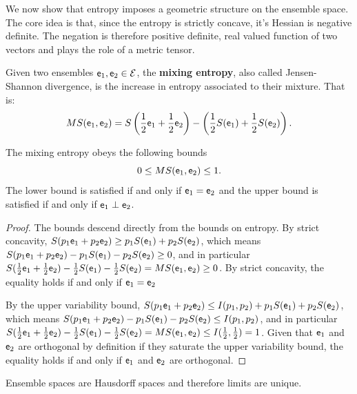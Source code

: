 We now show that entropy imposes a geometric structure on the ensemble space. The core idea is that, since the entropy is strictly concave, it's Hessian is negative definite. The negation is therefore positive definite, real valued function of two vectors and plays the role of a metric tensor.

\begin{defn}
	Given two ensembles $\mathsf{e}_1, \mathsf{e}_2 \in \mathcal{E}$, the \textbf{mixing entropy}, also called Jensen-Shannon divergence, is the increase in entropy associated to their mixture. That is:
	$$MS(\mathsf{e}_1, \mathsf{e}_2) = S\left(\frac{1}{2}\mathsf{e}_1 + \frac{1}{2} \mathsf{e}_2\right) - \left(\frac{1}{2} S(\mathsf{e}_1) + \frac{1}{2} S(\mathsf{e}_2)\right).$$
\end{defn}

\begin{coro}
	The mixing entropy obeys the following bounds
	$$ 0 \leq MS(\mathsf{e}_1, \mathsf{e}_2) \leq 1.$$
	The lower bound is satisfied if and only if $\mathsf{e}_1 = \mathsf{e}_2$ and the upper bound is satisfied if and only if $\mathsf{e}_1 \perp \mathsf{e}_2$.
\end{coro}

\begin{proof}
	The bounds descend directly from the bounds on entropy. By strict concavity, $S(p_1\mathsf{e}_1 + p_2 \mathsf{e}_2) \geq p_1 S(\mathsf{e}_1) + p_2 S(\mathsf{e}_2)$, which means $S(p_1\mathsf{e}_1 + p_2 \mathsf{e}_2) - p_1 S(\mathsf{e}_1) - p_2 S(\mathsf{e}_2) \geq 0$, and in particular $S(\frac{1}{2} \mathsf{e}_1 + \frac{1}{2} \mathsf{e}_2) - \frac{1}{2} S(\mathsf{e}_1) - \frac{1}{2} S(\mathsf{e}_2) = MS(\mathsf{e}_1, \mathsf{e}_2) \geq 0$. By strict concavity, the equality holds if and only if $\mathsf{e}_1 = \mathsf{e}_2$
	
	By the upper variability bound, $S(p_1\mathsf{e}_1 + p_2 \mathsf{e}_2) \leq I(p_1, p_2) + p_1 S(\mathsf{e}_1) + p_2 S(\mathsf{e}_2)$, which means $S(p_1\mathsf{e}_1 + p_2 \mathsf{e}_2) - p_1 S(\mathsf{e}_1) - p_2 S(\mathsf{e}_2) \leq I(p_1, p_2)$, and in particular $S(\frac{1}{2} \mathsf{e}_1 + \frac{1}{2} \mathsf{e}_2) - \frac{1}{2} S(\mathsf{e}_1) - \frac{1}{2} S(\mathsf{e}_2) = MS(\mathsf{e}_1, \mathsf{e}_2) \leq I(\frac{1}{2}, \frac{1}{2}) = 1$. Given that $\mathsf{e}_1$ and $\mathsf{e}_2$ are orthogonal by definition if they saturate the upper variability bound, the equality holds if and only if $\mathsf{e}_1$ and $\mathsf{e}_2$ are orthogonal.
\end{proof}

\begin{conj}
	Ensemble spaces are Hausdorff spaces and therefore limits are unique. 
\end{conj}


